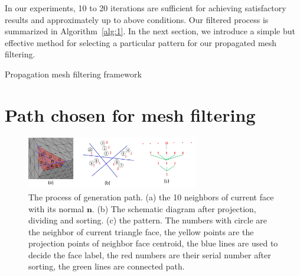  In our experiments, 10 to 20 iterations are sufficient for achieving satisfactory results and approximately up to above conditions.
 Our filtered process is summarized in Algorithm~\ref{alg:1}.
 In the next section, we introduce a simple but effective method for selecting a particular pattern for our propagated mesh filtering.



\begin{algorithm}\caption{Propagation mesh filtering framework}
\label{alg:1}
\begin{algorithmic}
\end{algorithmic}
\end{algorithm}



 \section{Path chosen for mesh filtering}
 \label{Sec:path}

\begin{figure}[htb]
\centering
\includegraphics[width = 7.5cm]{results/Path/path1.jpg}
\vspace{-3mm}
\caption{ The process of generation path. (a) the 10 neighbors of current face with its normal $\mathbf{n}$. (b) The schematic diagram after projection, dividing and sorting. (c) the pattern.
The numbers with circle are the neighbor of current triangle face, the yellow points are the projection points of neighbor face centroid, the blue lines are used to decide the face label, the red numbers are their serial number after sorting, the green lines are connected path.}
\label{Fig:path}
\end{figure}


